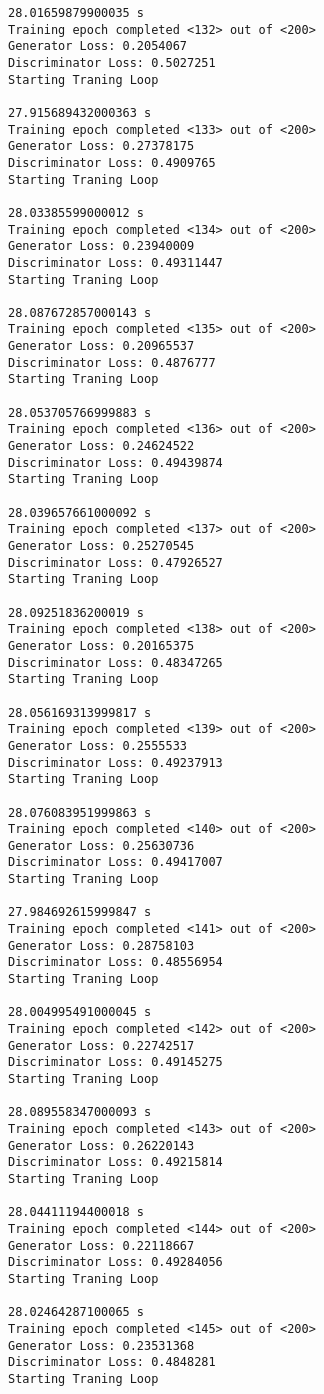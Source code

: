 \documentclass[11pt]{article}
\begin{document}
\begin{Verbatim}[commandchars=\\\{\}]
28.01659879900035 s
Training epoch completed <132> out of <200>
Generator Loss: 0.2054067
Discriminator Loss: 0.5027251
Starting Traning Loop 

27.915689432000363 s
Training epoch completed <133> out of <200>
Generator Loss: 0.27378175
Discriminator Loss: 0.4909765
Starting Traning Loop 

28.03385599000012 s
Training epoch completed <134> out of <200>
Generator Loss: 0.23940009
Discriminator Loss: 0.49311447
Starting Traning Loop 

28.087672857000143 s
Training epoch completed <135> out of <200>
Generator Loss: 0.20965537
Discriminator Loss: 0.4876777
Starting Traning Loop 

28.053705766999883 s
Training epoch completed <136> out of <200>
Generator Loss: 0.24624522
Discriminator Loss: 0.49439874
Starting Traning Loop 

28.039657661000092 s
Training epoch completed <137> out of <200>
Generator Loss: 0.25270545
Discriminator Loss: 0.47926527
Starting Traning Loop 

28.09251836200019 s
Training epoch completed <138> out of <200>
Generator Loss: 0.20165375
Discriminator Loss: 0.48347265
Starting Traning Loop 

28.056169313999817 s
Training epoch completed <139> out of <200>
Generator Loss: 0.2555533
Discriminator Loss: 0.49237913
Starting Traning Loop 

28.076083951999863 s
Training epoch completed <140> out of <200>
Generator Loss: 0.25630736
Discriminator Loss: 0.49417007
Starting Traning Loop 

27.984692615999847 s
Training epoch completed <141> out of <200>
Generator Loss: 0.28758103
Discriminator Loss: 0.48556954
Starting Traning Loop 

28.004995491000045 s
Training epoch completed <142> out of <200>
Generator Loss: 0.22742517
Discriminator Loss: 0.49145275
Starting Traning Loop 

28.089558347000093 s
Training epoch completed <143> out of <200>
Generator Loss: 0.26220143
Discriminator Loss: 0.49215814
Starting Traning Loop 

28.04411194400018 s
Training epoch completed <144> out of <200>
Generator Loss: 0.22118667
Discriminator Loss: 0.49284056
Starting Traning Loop 

28.02464287100065 s
Training epoch completed <145> out of <200>
Generator Loss: 0.23531368
Discriminator Loss: 0.4848281
Starting Traning Loop 


\end{Verbatim}
\end{document}
